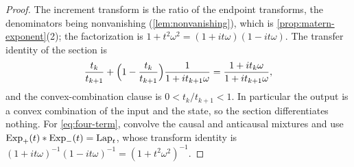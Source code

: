\begin{proof}
The increment transform is the ratio of the endpoint transforms, the denominators being
nonvanishing (\ref{lem:nonvanishing}), which is \ref{prop:matern-exponent}(2); the
factorization is $1 + t^2\omega^2 = (1+it\omega)(1-it\omega)$. The transfer identity of the
section is
\[
  \frac{t_k}{t_{k+1}} + \Bigl(1 - \frac{t_k}{t_{k+1}}\Bigr)\frac{1}{1+it_{k+1}\omega}
  = \frac{1 + it_k\omega}{1 + it_{k+1}\omega},
\]
and the convex-combination clause is $0 < t_k/t_{k+1} < 1$. In particular the output is a convex
combination of the input and the state, so the section differentiates nothing. For
\ref{eq:four-term}, convolve the
causal and anticausal mixtures and use $\operatorname{Exp}_+(t) * \operatorname{Exp}_-(t) = \operatorname{Lap}_t$, whose transform identity
is $(1+it\omega)^{-1}(1-it\omega)^{-1} = (1+t^2\omega^2)^{-1}$.
\end{proof}


